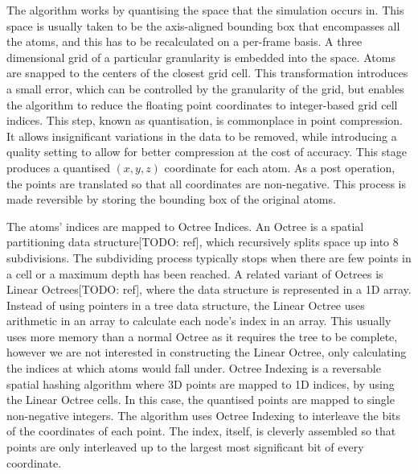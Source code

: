 \documentclass[a4paper,11pt]{report}
\begin{document}
The algorithm works by quantising the space that the simulation occurs in. This space is usually taken to be the axis-aligned bounding box that encompasses all the atoms, and this has to be recalculated on a per-frame basis. A three dimensional grid of a particular granularity is embedded into the space. Atoms are snapped to the centers of the closest grid cell. This transformation introduces a small error, which can be controlled by the granularity of the grid, but enables the algorithm to reduce the floating point coordinates to integer-based grid cell indices. This step, known as quantisation, is commonplace in point compression. It allows insignificant variations in the data to be removed, while introducing a quality setting to allow for better compression at the cost of accuracy. This stage produces a quantised $(x, y, z)$ coordinate for each atom. As a post operation, the points are translated so that all coordinates are non-negative. This process is made reversible by storing the bounding box of the original atoms.

The atoms' indices are mapped to Octree Indices. An Octree is a spatial partitioning data structure[TODO: ref], which recursively splits space up into 8 subdivisions. The subdividing process typically stops when there are few points in a cell or a maximum depth has been reached. A related variant of Octrees is Linear Octrees[TODO: ref], where the data structure is represented in a 1D array. Instead of using pointers in a tree data structure, the Linear Octree uses arithmetic in an array to calculate each node's index in an array. This usually uses more memory than a normal Octree as it requires the tree to be complete, however we are not interested in constructing the Linear Octree, only calculating the indices at which atoms would fall under. Octree Indexing is a reversable spatial hashing algorithm where 3D points are mapped to 1D indices, by using the Linear Octree cells. In this case, the quantised points are mapped to single non-negative integers. The algorithm uses Octree Indexing to interleave the bits of the coordinates of each point. The index, itself, is cleverly assembled so that points are only interleaved up to the largest most significant bit of every coordinate.
\end{document}
